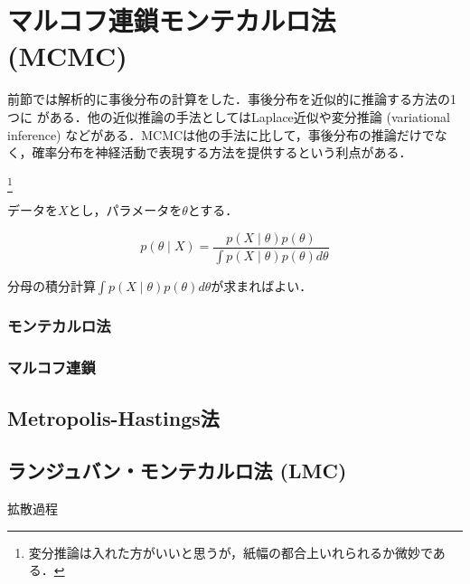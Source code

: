 \section{マルコフ連鎖モンテカルロ法 (MCMC)}
前節では解析的に事後分布の計算をした．事後分布を近似的に推論する方法の1つに\textbf{} がある．他の近似推論の手法としてはLaplace近似や変分推論 (variational inference) などがある．MCMCは他の手法に比して，事後分布の推論だけでなく，確率分布を神経活動で表現する方法を提供するという利点がある．

\footnote{
変分推論は入れた方がいいと思うが，紙幅の都合上いれられるか微妙である．
}

データを$X$とし，パラメータを$\theta$とする．


\begin{equation}
p(\theta\mid X)=\frac{p(X\mid \theta)p(\theta)}{\int p(X\mid \theta)p(\theta)d\theta}
\end{equation}


分母の積分計算$\int p(X\mid \theta)p(\theta)d\theta$が求まればよい．

\subsubsection{モンテカルロ法}

\subsubsection{マルコフ連鎖}
\subsection{Metropolis-Hastings法}










\subsection{ランジュバン・モンテカルロ法 (LMC)}
拡散過程


